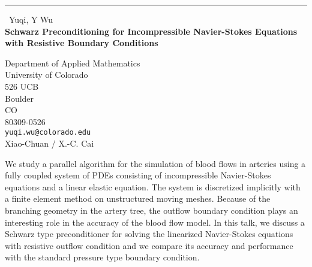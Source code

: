 \documentclass{report}
\begin{document}
\begin{center}
\rule{6in}{1pt} \
{\large Yuqi, Y Wu \\
{\bf Schwarz Preconditioning for Incompressible Navier-Stokes Equations with Resistive Boundary Conditions}}

Department of Applied Mathematics \\ University of Colorado \\ 526 UCB \\ Boulder \\ CO \\ 80309-0526
\\
{\tt yuqi.wu@colorado.edu}\\
Xiao-Chuan / X.-C. Cai\end{center}

We study a parallel algorithm for the simulation of blood flows in
arteries using a fully coupled system of PDEs consisting of
incompressible Navier-Stokes equations and a linear elastic equation. The
system is discretized implicitly with a finite element method on
unstructured moving meshes. Because of the branching geometry in the
artery tree, the outflow boundary condition plays an interesting role in
the accuracy of the blood flow model. In this talk, we discuss a Schwarz
type preconditioner for solving the linearized Navier-Stokes equations
with resistive outflow condition and we compare its accuracy and
performance with the standard pressure type boundary condition.
\end{document}
